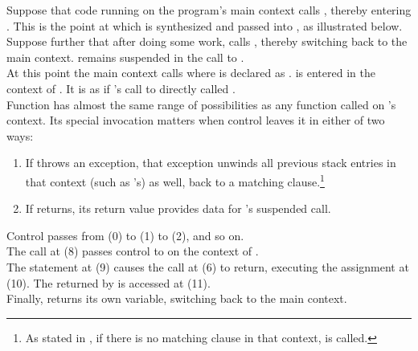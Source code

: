 Suppose that code running on the program's main context calls ,
thereby entering . This is the point at which  is synthesized
and passed into , as illustrated below.\\

Suppose further that after doing some work,  calls ,
thereby switching back to the main context.  remains suspended
in the call to .\\

At this point the main context calls 
where  is declared as .  is
entered in the context of . It is as if 's call
to  directly called .\\

Function  has almost the same range of possibilities as any function
called on 's context. Its special invocation matters when control
leaves it in either of two ways:

\begin{enumerate}
  \item If  throws an exception, that exception unwinds all previous
        stack entries in that context (such as 's) as well, back to a
        matching  clause.\footnote{As stated in ,
        if there is no matching  clause in that context,
         is called.}
  \item If  returns, its return value provides data for
        's suspended  call.
\end{enumerate}


Control passes from (0) to (1) to (2), and so on.\\

The  call at (8) passes control
to  on the context of .\\

The  statement at (9) causes the \resume call at (6) to return,
executing the assignment at (10). The  returned by  is
accessed at (11).\\

Finally,  returns its own  variable, switching back to the main
context.\\

